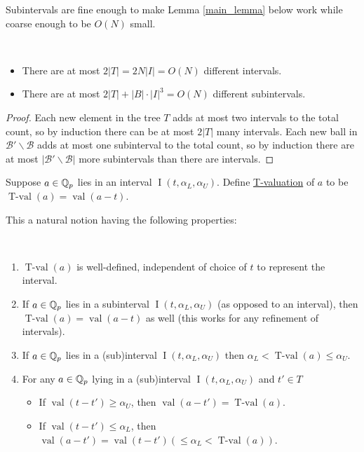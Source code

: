 \documentclass{amsart}
\newcommand{\BB}{\mathscr B}
\newcommand{\paren}[1]{\left(#1\right)}
\DeclareMathOperator{\vval}{val}
\DeclareMathOperator{\tval}{T-val}
\DeclareMathOperator{\inti}{I}
\newcommand{\defn}{\underline}
\newcommand{\interval}{\inti(t, \alpha_L, \alpha_U)}
\begin{document}
Subintervals are fine enough to make Lemma \ref{main_lemma} below work while coarse enough to be $O(N)$ small.
\begin{Lemma} \label{interval_count}\ 
  \begin{itemize}
  \item 
    There are at most $2|T| = 2 N |I| = O(N)$ different intervals.
  \item 
    There are at most $2|T| + |B| \cdot |I|^3 = O(N)$ different subintervals.
  \end{itemize}
\end{Lemma}

\begin{proof}
  Each new element in the tree $T$ adds at most two intervals to the total count,
  so by induction there can be at most $2|T|$ many intervals.
  Each new ball in $\BB' \backslash \BB$ adds at most one subinterval to the total count,
  so by induction there are at most $|\BB' \backslash \BB|$ more subintervals than there are intervals.
\end{proof}


\begin{Definition}
  Suppose $a \in \mathbb{Q}_p$ lies in an interval $\interval$. 
  Define \defn{T-valuation} of $a$ to be $\tval(a) = \vval(a - t)$.    
\end{Definition}

This a natural notion having the following properties:
\begin{Lemma}  \label{tval} \ 
  \begin{enumerate}[label=(\alph*)]
  \item $\tval(a)$ is well-defined, independent of choice of $t$ to represent the interval.
  \item If $a \in \mathbb{Q}_p$ lies in a subinterval $\interval$ (as opposed to an interval),
    then $\tval(a) = \vval(a - t)$ as well (this works for any refinement of intervals).
  \item If $a \in \mathbb{Q}_p$ lies in a (sub)interval $\interval$ 
    then $\alpha_L < \tval(a) \leq \alpha_U$.
  \item For any $a \in \mathbb{Q}_p$ lying in a (sub)interval $\interval$ and $t' \in T$
    \begin{itemize}
    \item If $\vval(t - t') \geq \alpha_U$, then $\vval(a - t') = \tval(a)$. 
    \item If $\vval(t - t') \leq \alpha_L$, then $\vval(a - t') = \vval(t - t') \paren{\leq \alpha_L < \tval(a)}$. 
    \end{itemize}
  \end{enumerate}
\end{Lemma}
\end{document}
